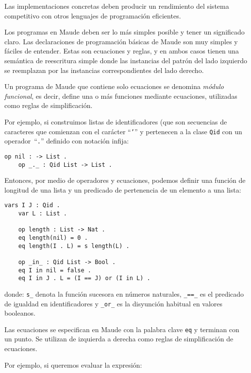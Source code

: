 Las implementaciones concretas deben producir un rendimiento del sistema competitivo con otros lenguajes de programación eficientes.
\smallskip

Los programas en Maude deben ser lo más simples posible y tener un significado claro.
%
Las declaraciones de programación básicas de Maude son muy simples y fáciles de entender. Estas son ecuaciones y reglas, y en ambos casos tienen una semántica de reescritura simple donde las instancias del patrón del lado izquierdo se reemplazan por las instancias correspondientes del lado derecho.
\smallskip

Un programa de Maude que contiene solo ecuaciones se denomina \textit{módulo funcional}, es decir, define una o más funciones mediante ecuaciones, utilizadas como reglas de simplificación.
\smallskip

Por ejemplo, si construimos listas de identificadores (que son secuencias de caracteres que comienzan con el carácter ``\texttt{'}'' y pertenecen a la clase \texttt{Qid} con un operador~``\texttt{.}'' definido con notación infija:

\begin{lstlisting}[language=Maude]
	op nil : -> List .
	op _._ : Qid List -> List .
\end{lstlisting}
\medskip

\noindent
Entonces, por medio de operadores y ecuaciones, podemos definir una función de longitud de una lista y un predicado de pertenencia de un elemento a una lista:

\begin{lstlisting}[language=Maude]
	vars I J : Qid .
	var L : List .

	op length : List -> Nat .
	eq length(nil) = 0 .
	eq length(I . L) = s length(L) .

	op _in_ : Qid List -> Bool .
	eq I in nil = false .
	eq I in J . L = (I == J) or (I in L) .
\end{lstlisting}
\medskip

\noindent
donde:
  \verb$s_$ denota la función sucesora en números naturales,
  \verb$_==_$ es el predicado de igualdad en identificadores y
  \verb$_or_$ es la disyunción habitual en valores booleanos.
\smallskip

Las ecuaciones se especifican en Maude con la palabra clave \texttt{eq} y terminan con un punto. Se utilizan de izquierda a derecha como reglas de simplificación de ecuaciones.
\smallskip

Por ejemplo, si queremos evaluar la expresión:

